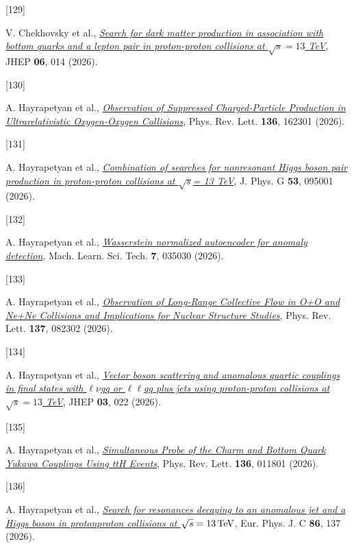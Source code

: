 \documentclass[
]{article}
\newlength{\cslhangindent}
\newlength{\csllabelwidth}
\newenvironment{CSLReferences}[2] %
 {\begin{list}{}{%
  \setlength{\itemindent}{0pt}
  \setlength{\leftmargin}{0pt}
  \setlength{\parsep}{0pt}
  \ifodd #1
   \setlength{\leftmargin}{\cslhangindent}
   \setlength{\itemindent}{-1\cslhangindent}
  \fi
  \setlength{\itemsep}{#2\baselineskip}}}
 {\end{list}}
\newcommand{\CSLLeftMargin}[1]{\parbox[t]{\csllabelwidth}{\strut#1\strut}}
\newcommand{\CSLRightInline}[1]{\parbox[t]{\linewidth - \csllabelwidth}{\strut#1\strut}}
\begin{document}
\begin{CSLReferences}{0}{0}
\CSLLeftMargin{{[}129{]} }%
\CSLRightInline{V. Chekhovsky et al.,
\emph{\href{https://doi.org/10.1007/JHEP06(2026)014}{{Search for dark
matter production in association with bottom quarks and a lepton pair in
proton-proton collisions at \(\sqrt{s}=13\) TeV}}}, JHEP \textbf{06},
014 (2026).}

\CSLLeftMargin{{[}130{]} }%
\CSLRightInline{A. Hayrapetyan et al.,
\emph{\href{https://doi.org/10.1103/89sf-9t1x}{{Observation of
Suppressed Charged-Particle Production in Ultrarelativistic
Oxygen-Oxygen Collisions}}}, Phys. Rev. Lett. \textbf{136}, 162301
(2026).}

\CSLLeftMargin{{[}131{]} }%
\CSLRightInline{A. Hayrapetyan et al.,
\emph{\href{https://doi.org/10.1088/1361-6471/ae8ff1}{{Combination of
searches for nonresonant Higgs boson pair production in proton-proton
collisions at \(\sqrt{s}\)= 13 TeV}}}, J. Phys. G \textbf{53}, 095001
(2026).}

\CSLLeftMargin{{[}132{]} }%
\CSLRightInline{A. Hayrapetyan et al.,
\emph{\href{https://doi.org/10.1088/2632-2153/ae6168}{{Wasserstein
normalized autoencoder for anomaly detection}}}, Mach. Learn. Sci. Tech.
\textbf{7}, 035030 (2026).}

\CSLLeftMargin{{[}133{]} }%
\CSLRightInline{A. Hayrapetyan et al.,
\emph{\href{https://doi.org/10.1103/26wx-tg6f}{{Observation of
Long-Range Collective Flow in O+O and Ne+Ne Collisions and Implications
for Nuclear Structure Studies}}}, Phys. Rev. Lett. \textbf{137}, 082302
(2026).}

\CSLLeftMargin{{[}134{]} }%
\CSLRightInline{A. Hayrapetyan et al.,
\emph{\href{https://doi.org/10.1007/JHEP03(2026)022}{{Vector boson
scattering and anomalous quartic couplings in final states with
{\(\ell\)}{\(\nu\)}qq or {\(\ell\)}{\(\ell\)}qq plus jets using
proton-proton collisions at \(\sqrt{s}=13\) TeV}}}, JHEP \textbf{03},
022 (2026).}

\CSLLeftMargin{{[}135{]} }%
\CSLRightInline{A. Hayrapetyan et al.,
\emph{\href{https://doi.org/10.1103/9nwb-splk}{{Simultaneous Probe of
the Charm and Bottom Quark Yukawa Couplings Using tt{\textasciimacron}H
Events}}}, Phys. Rev. Lett. \textbf{136}, 011801 (2026).}

\CSLLeftMargin{{[}136{]} }%
\CSLRightInline{A. Hayrapetyan et al.,
\emph{\href{https://doi.org/10.1140/epjc/s10052-025-15176-9}{{Search for
resonances decaying to an anomalous jet and a Higgs boson in
proton{\textendash}proton collisions at
\(\sqrt{s}=13\,\text {Te}\hspace{-.08em}\text {V}\)}}}, Eur. Phys. J. C
\textbf{86}, 137 (2026).}


\end{CSLReferences}
\end{document}
